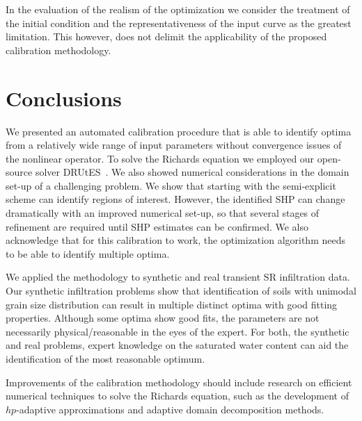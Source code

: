 \documentclass[review,times,3p,10pt]{elsarticle}
\begin{document}
In the evaluation of the realism of the optimization we consider the treatment of the initial condition and the representativeness of the input curve as the greatest limitation. This however, does not delimit the applicability of the proposed calibration methodology. 

 

\section{Conclusions}
\bigskip

We presented an automated calibration procedure that is able to identify optima from a relatively wide range of input parameters without convergence issues of the nonlinear operator. To solve the Richards equation we employed our open-source solver DRUtES~\citep{drutes}. We also showed numerical considerations in the domain set-up of a challenging problem. We show that starting with the semi-explicit scheme can identify regions of interest. However, the identified SHP can change dramatically with an improved numerical set-up, so that several stages of refinement are required until SHP estimates can be confirmed. We also acknowledge that for this calibration to work, the optimization algorithm needs to be able to identify multiple optima. 

We applied the methodology to synthetic and real transient SR infiltration data. Our synthetic infiltration problems show that identification of soils with unimodal grain size distribution can result in multiple distinct optima with good fitting properties. Although some optima show good fits, the parameters are not necessarily physical/reasonable in the eyes of the expert. For both, the synthetic and real problems, expert knowledge on the saturated water content can aid the identification of the most reasonable optimum. 

Improvements of the calibration methodology should include research on efficient numerical techniques to solve the Richards equation, such as the development of $hp$-adaptive approximations and adaptive domain decomposition  methods.


\end{document}
